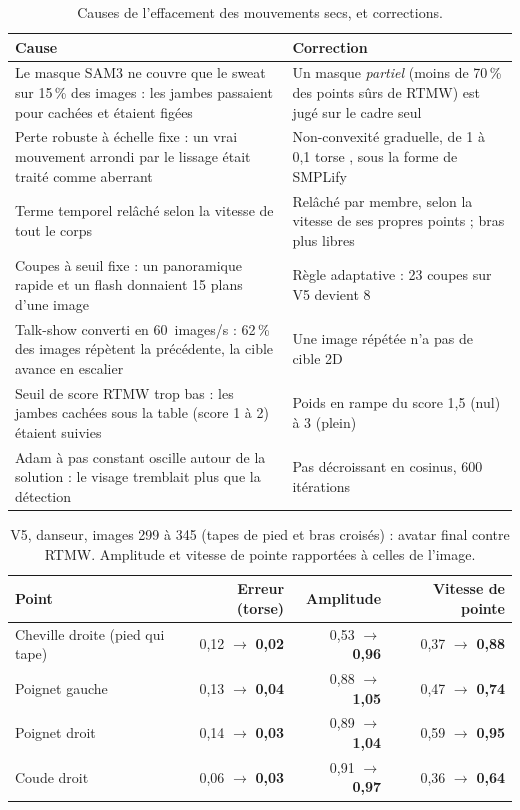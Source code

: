 \documentclass[11pt,a4paper]{report}
\begin{document}
\begin{table}[H]
\centering
\caption{Causes de l'effacement des mouvements secs, et corrections.}
\label{tab:sharp}
\footnotesize
\begin{tabularx}{\textwidth}{@{}YY@{}}
\toprule
Cause & Correction \\
\midrule
Le masque SAM3 ne couvre que le sweat sur 15\,\% des images : les jambes passaient pour cachées et étaient figées & Un masque
\emph{partiel} (moins de 70\,\% des points sûrs de RTMW) est jugé sur le cadre seul \\
Perte robuste à échelle fixe : un vrai mouvement arrondi par le lissage était traité comme aberrant & Non-convexité graduelle, de 1 à
0,1 torse \cite{yang2020gnc}, sous la forme de SMPLify \cite{bogo2016smplify} \\
Terme temporel relâché selon la vitesse de tout le corps & Relâché par membre, selon la vitesse de ses propres points ; bras plus
libres \\
Coupes à seuil fixe : un panoramique rapide et un flash donnaient 15 plans d'une image & Règle adaptative \cite{pyscenedetect} : 23
coupes sur V5 devient 8 \\
Talk-show converti en 60~images/s : 62\,\% des images répètent la précédente, la cible avance en escalier & Une image répétée n'a
pas de cible 2D \\
Seuil de score RTMW trop bas : les jambes cachées sous la table (score 1 à 2) étaient suivies & Poids en rampe du score 1,5 (nul) à 3
(plein) \\
Adam à pas constant oscille autour de la solution : le visage tremblait plus que la détection & Pas décroissant en cosinus, 600
itérations \\
\bottomrule
\end{tabularx}
\end{table}

\begin{table}[H]
\centering
\caption{V5, danseur, images 299 à 345 (tapes de pied et bras croisés) : avatar final contre RTMW. Amplitude et vitesse de pointe
rapportées à celles de l'image.}
\label{tab:sharp-res}
\small
\begin{tabular}{@{}lrrr@{}}
\toprule
Point & Erreur (torse) & Amplitude & Vitesse de pointe \\
\midrule
Cheville droite (pied qui tape) & 0,12 $\to$ \textbf{0,02} & 0,53 $\to$ \textbf{0,96} & 0,37 $\to$ \textbf{0,88} \\
Poignet gauche & 0,13 $\to$ \textbf{0,04} & 0,88 $\to$ \textbf{1,05} & 0,47 $\to$ \textbf{0,74} \\
Poignet droit & 0,14 $\to$ \textbf{0,03} & 0,89 $\to$ \textbf{1,04} & 0,59 $\to$ \textbf{0,95} \\
Coude droit & 0,06 $\to$ \textbf{0,03} & 0,91 $\to$ \textbf{0,97} & 0,36 $\to$ \textbf{0,64} \\
\bottomrule
\end{tabular}
\end{table}
\end{document}
